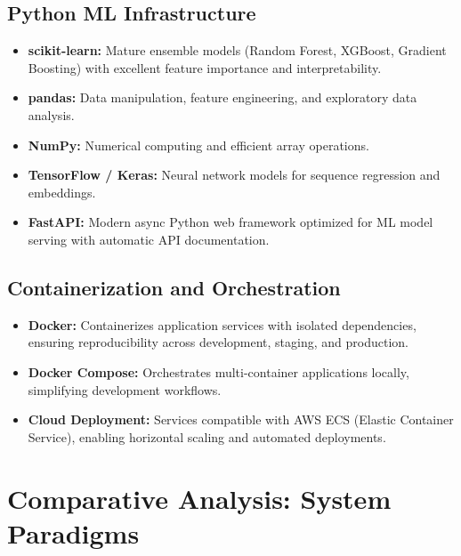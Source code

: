 \documentclass[12pt,a4paper]{report}
\begin{document}
\subsection{Python ML Infrastructure}

\begin{itemize}
    \item \textbf{scikit-learn:} Mature ensemble models (Random Forest, XGBoost, Gradient Boosting) with excellent feature importance and interpretability.
    \item \textbf{pandas:} Data manipulation, feature engineering, and exploratory data analysis.
    \item \textbf{NumPy:} Numerical computing and efficient array operations.
    \item \textbf{TensorFlow / Keras:} Neural network models for sequence regression and embeddings.
    \item \textbf{FastAPI:} Modern async Python web framework optimized for ML model serving with automatic API documentation.
\end{itemize}

\subsection{Containerization and Orchestration}

\begin{itemize}
    \item \textbf{Docker:} Containerizes application services with isolated dependencies, ensuring reproducibility across development, staging, and production.
    \item \textbf{Docker Compose:} Orchestrates multi-container applications locally, simplifying development workflows.
    \item \textbf{Cloud Deployment:} Services compatible with AWS ECS (Elastic Container Service), enabling horizontal scaling and automated deployments.
\end{itemize}

\section{Comparative Analysis: System Paradigms}
\end{document}

